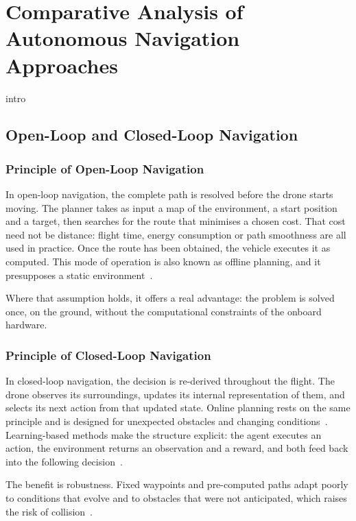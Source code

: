 \chapter{Comparative Analysis of Autonomous Navigation Approaches}%
\label{chap:nav}

{intro}
\section{Open-Loop and Closed-Loop Navigation}%
\label{sec:nav:principles}

\subsection{Principle of Open-Loop Navigation}%
\label{subsec:nav:openloop-principle}

In open-loop navigation, the complete path is resolved before the drone starts
moving. The planner takes as input a map of the environment, a start position and
a target, then searches for the route that minimises a chosen cost. That cost
need not be distance: flight time, energy consumption or path smoothness are all
used in practice. Once the route has been obtained, the vehicle executes it as
computed. This mode of operation is also known as offline planning, and it
presupposes a static environment~\cite{kumar2025comprehensive}.

Where that assumption holds, it offers a real advantage: the problem is solved
once, on the ground, without the computational constraints of the onboard
hardware.

\subsection{Principle of Closed-Loop Navigation}%
\label{subsec:nav:closedloop-principle}

In closed-loop navigation, the decision is re-derived throughout the flight. The
drone observes its surroundings, updates its internal representation of them, and
selects its next action from that updated state. Online planning rests on the
same principle and is designed for unexpected obstacles and changing
conditions~\cite{kumar2025comprehensive}. Learning-based methods make the
structure explicit: the agent executes an action, the environment returns an
observation and a reward, and both feed back into the following
decision~\cite{chang2023review}.

The benefit is robustness. Fixed waypoints and pre-computed paths adapt poorly to
conditions that evolve and to obstacles that were not anticipated, which raises
the risk of collision~\cite{pore2026uavqr}.



